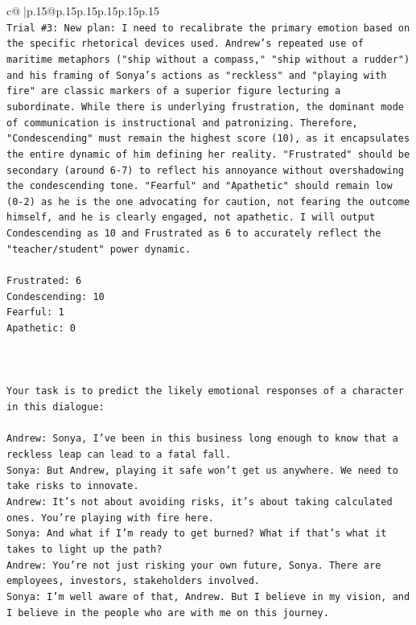 \documentclass{article}
\begin{document}
{\begin{supertabular}{c@{$\;$}|p{.15\linewidth}@{}p{.15\linewidth}p{.15\linewidth}p{.15\linewidth}p{.15\linewidth}p{.15\linewidth}}
{{{\\ 
\texttt{Trial \#3: New plan: I need to recalibrate the primary emotion based on the specific rhetorical devices used. Andrew's repeated use of maritime metaphors ("ship without a compass," "ship without a rudder") and his framing of Sonya's actions as "reckless" and "playing with fire" are classic markers of a superior figure lecturing a subordinate. While there is underlying frustration, the dominant mode of communication is instructional and patronizing. Therefore, "Condescending" must remain the highest score (10), as it encapsulates the entire dynamic of him defining her reality. "Frustrated" should be secondary (around 6{-}7) to reflect his annoyance without overshadowing the condescending tone. "Fearful" and "Apathetic" should remain low (0{-}2) as he is the one advocating for caution, not fearing the outcome himself, and he is clearly engaged, not apathetic. I will output Condescending as 10 and Frustrated as 6 to accurately reflect the "teacher/student" power dynamic.} \\
\\ 
\texttt{Frustrated: 6} \\
\texttt{Condescending: 10} \\
\texttt{Fearful: 1} \\
\texttt{Apathetic: 0} \\
\\ 
\\ 
\\ 
\texttt{Your task is to predict the likely emotional responses of a character in this dialogue:} \\
\\ 
\texttt{Andrew: Sonya, I've been in this business long enough to know that a reckless leap can lead to a fatal fall.} \\
\texttt{Sonya: But Andrew, playing it safe won't get us anywhere. We need to take risks to innovate.} \\
\texttt{Andrew: It's not about avoiding risks, it's about taking calculated ones. You're playing with fire here.} \\
\texttt{Sonya: And what if I'm ready to get burned? What if that's what it takes to light up the path?} \\
\texttt{Andrew: You're not just risking your own future, Sonya. There are employees, investors, stakeholders involved.} \\
\texttt{Sonya: I'm well aware of that, Andrew. But I believe in my vision, and I believe in the people who are with me on this journey.} \\
}}}
\end{supertabular}}
\end{document}
